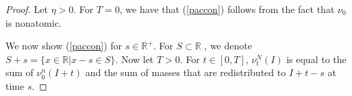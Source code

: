 \begin{proof}
Let $\eta > 0$. For $T = 0$, we have that (\ref{paccon}) follows from the fact that $\nu_0$ is nonatomic.
% 
% 
%  
%  

We now show (\ref{paccon}) for $s \in \mathbb{R}^+$. For $S\subset \mathbb{R}$  , we denote $S+s = \{x \in \mathbb{R}|x-s \in S\}$. Now let $T>0$.  For $t\in [0,T]$, $\nu_t^N(I)$ is equal to the sum of $\nu_0^n(I+t)$ and the sum of masses that are redistributed to $I+t-s$ at time $s$.


\end{proof}
